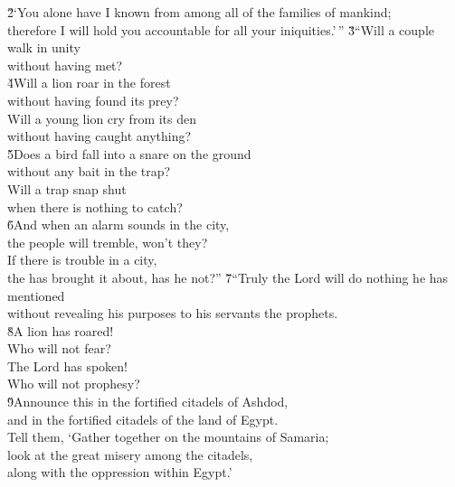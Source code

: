 \begin{poetry}
\poeml \v{2}`You alone have I known from among all of the families of mankind; \\
\poemll    therefore I will hold you accountable for all your iniquities.'\,''
\poeml \v{3}``Will a couple walk in unity \\
\poemll    without having met? \\
\poeml \v{4}Will a lion roar in the forest \\
\poemll    without having found its prey? \\
\poeml Will a young lion cry from its den \\
\poemll    without having caught anything? \\
\poeml \v{5}Does a bird fall into a snare on the ground \\
\poemll    without any bait in the trap? \\
\poeml Will a trap snap shut \\
\poemll    when there is nothing to catch? \\
\poeml \v{6}And when an alarm sounds in the city, \\
\poemll    the people will tremble, won't they? \\
\poeml If there is trouble in a city, \\
\poemll    the  has brought it about, has he not?''
\poeml \v{7}``Truly the Lord  will do nothing he has mentioned \\
\poemll    without revealing his purposes to his servants the prophets. \\
\poeml \v{8}A lion has roared! \\
\poemll    Who will not fear? \\
\poeml The Lord  has spoken! \\
\poemll    Who will not prophesy? \\
\poeml \v{9}Announce this in the fortified citadels of Ashdod, \\
\poemll    and in the fortified citadels of the land of Egypt. \\
\poeml Tell them, `Gather together on the mountains of Samaria; \\
\poemll    look at the great misery among the citadels, \\
\poemlll       along with the oppression within Egypt.' \\

\end{poetry}
